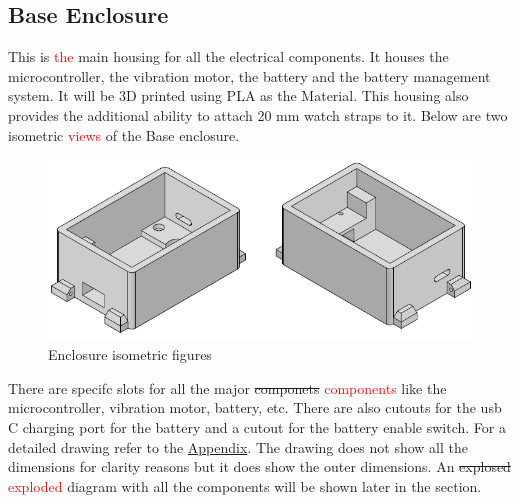 \documentclass[12pt, titlepage]{article}
\begin{document}
\subsection{Base Enclosure}
This is \textcolor{red}{the} main housing for all the electrical components. It houses the microcontroller, the vibration motor, the battery and the battery management system. It will be 3D printed using PLA as the Material. This housing also provides the additional ability to attach 20 mm watch straps to it.
Below are two isometric \textcolor{red}{views} of the Base enclosure. 
\begin{figure}[H]
  \includegraphics[width=\textwidth,height=\textheight,keepaspectratio]{Base_ISO.png}
  \caption{Enclosure isometric figures}
  \label{EnclosureISO} 
\end{figure}
\noindent There are specifc slots for all the major \sout{componets} \textcolor{red}{components} like the microcontroller, vibration motor, battery, etc. There are also cutouts for the usb C charging port for the battery and a cutout for the battery enable switch. For a detailed drawing refer to the \hyperref[appendix:hardware:enclosureDWG]{Appendix}. The drawing does not show all the dimensions for clarity reasons but it does show the outer dimensions. An \sout{explosed} \textcolor{red}{exploded} diagram with all the components will be shown later in the section. 
 
\end{document}

